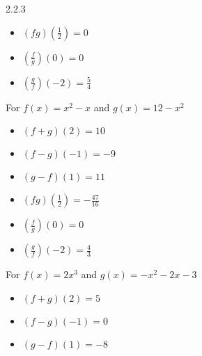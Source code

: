 \begin{Answer}{2.2.3}
\begin{multicols}{3}
\begin{itemize}
			\item  $(fg)\left(\frac{1}{2}\right) = 0$
			\item  $\left(\frac{f}{g}\right)(0) = 0$
			\item  $\left(\frac{g}{f}\right)\left(-2\right) = \frac{5}{4}$

		\end{itemize}
	\end{multicols}

	\item For  $f(x) = x^2 - x$ and  $g(x) = 12-x^2$

	\begin{multicols}{3}
		\begin{itemize}

			\item  $(f+g)(2) = 10$
			\item  $(f-g)(-1) = -9$
			\item  $(g-f)(1) = 11$

		\end{itemize}
	\end{multicols}

	\begin{multicols}{3}
		\begin{itemize}

			\item  $(fg)\left(\frac{1}{2}\right) = -\frac{47}{16}$
			\item  $\left(\frac{f}{g}\right)(0) = 0$
			\item  $\left(\frac{g}{f}\right)\left(-2\right) = \frac{4}{3}$

		\end{itemize}
	\end{multicols}

	\item For $f(x) = 2x^3$ and  $g(x) = -x^2-2x-3$

	\begin{multicols}{3}
		\begin{itemize}

			\item  $(f+g)(2) = 5$
			\item  $(f-g)(-1) = 0$
			\item  $(g-f)(1) = -8$

		\end{itemize}
	\end{multicols}

	\begin{multicols}{3}
		\begin{itemize}


\end{itemize}
\end{multicols}
\end{Answer}
